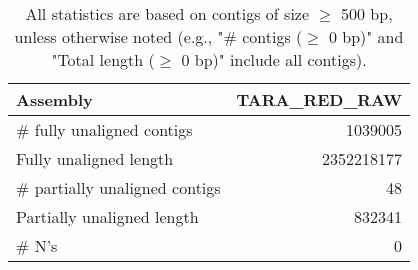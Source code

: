 \documentclass[12pt,a4paper]{article}
\begin{document}
\begin{table}[ht]
\begin{center}
\caption{All statistics are based on contigs of size $\geq$ 500 bp, unless otherwise noted (e.g., "\# contigs ($\geq$ 0 bp)" and "Total length ($\geq$ 0 bp)" include all contigs).}
\begin{tabular}{|l*{1}{|r}|}
\hline
Assembly & TARA\_RED\_RAW \\ \hline
\# fully unaligned contigs & 1039005 \\ \hline
Fully unaligned length & 2352218177 \\ \hline
\# partially unaligned contigs & 48 \\ \hline
Partially unaligned length & 832341 \\ \hline
\# N's & 0 \\ \hline
\end{tabular}
\end{center}
\end{table}
\end{document}

